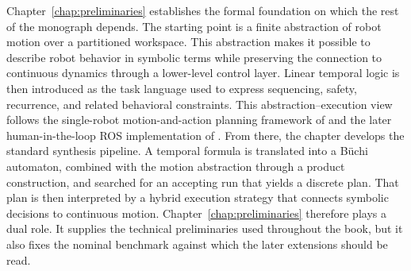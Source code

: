 Chapter~\ref{chap:preliminaries} establishes the formal foundation on which the
rest of the monograph depends. The starting point is a finite abstraction of
robot motion over a partitioned workspace. This abstraction makes it possible
to describe robot behavior in symbolic terms while preserving the connection to
continuous dynamics through a lower-level control layer. Linear temporal logic
is then introduced as the task language used to express sequencing, safety,
recurrence, and related behavioral constraints. This abstraction--execution
view follows the single-robot motion-and-action planning framework of
\citet{guo2013motion} and the later human-in-the-loop ROS implementation of
\citet{baran2021ros}.
From there, the chapter develops the standard synthesis pipeline. A temporal
formula is translated into a B\"uchi automaton, combined with the motion
abstraction through a product construction, and searched for an accepting run
that yields a discrete plan. That plan is then interpreted by a hybrid
execution strategy that connects symbolic decisions to continuous motion.
Chapter~\ref{chap:preliminaries} therefore plays a dual role. It supplies the
technical preliminaries used throughout the book, but it also fixes the
nominal benchmark against which the later extensions should be read.

\subsection{}
\label{sec:ch01:outline:bottomup}

